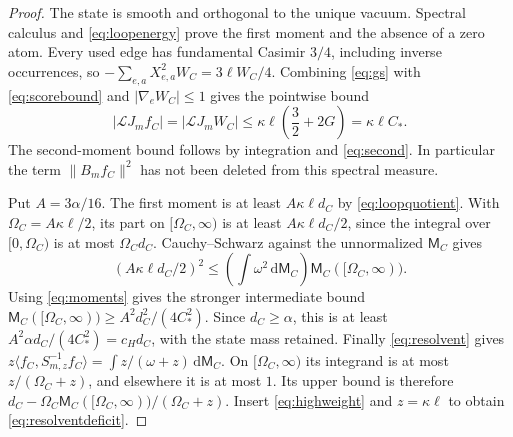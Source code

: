 \documentclass[11pt]{article}
\newcommand{\dd}{\,\mathrm d}
\newcommand{\LL}{\mathscr L}
\begin{document}
\begin{proof}
The state is smooth and orthogonal to the unique vacuum. Spectral
calculus and \eqref{eq:loopenergy} prove the first moment and the
absence of a zero atom. Every used edge has fundamental Casimir $3/4$,
including inverse occurrences, so
$-\sum_{e,a}X_{e,a}^2W_C=3\ell W_C/4$.
Combining \eqref{eq:gs} with \eqref{eq:scorebound} and
$|\nabla_e W_C|\leq1$ gives the pointwise bound
\[
 |\LL J_mf_C|=|\LL J_mW_C|
 \leq\kappa\ell\left(\frac32+2G\right)=\kappa\ell C_*.
\]
The second-moment bound follows by integration and
\eqref{eq:second}. In particular the term $\|B_mf_C\|^2$ has not been
deleted from this spectral measure.

Put $A=3\alpha/16$. The first moment is at least $A\kappa\ell d_C$
by \eqref{eq:loopquotient}. With $\Omega_C=A\kappa\ell/2$, its part on
$[\Omega_C,\infty)$ is at least $A\kappa\ell d_C/2$, since the integral
over $[0,\Omega_C)$ is at most $\Omega_C d_C$.
Cauchy--Schwarz against the unnormalized $\mathsf M_C$ gives
\[
 (A\kappa\ell d_C/2)^2
 \leq\left(\int\omega^2\dd\mathsf M_C\right)
                       \mathsf M_C([\Omega_C,\infty)).
\]
Using \eqref{eq:moments} gives the stronger intermediate bound
$\mathsf M_C([\Omega_C,\infty))\geq A^2d_C^2/(4C_*^2)$.
Since $d_C\geq\alpha$, this is at least
$A^2\alpha d_C/(4C_*^2)=c_Hd_C$, with the state mass retained.
Finally \eqref{eq:resolvent} gives
$z\langle f_C,S_{m,z}^{-1}f_C\rangle
=\int z/(\omega+z)\dd\mathsf M_C$.
On $[\Omega_C,\infty)$ its integrand is at most
$z/(\Omega_C+z)$, and elsewhere it is at most $1$.
Its upper bound is therefore
$d_C-\Omega_C\mathsf M_C([\Omega_C,\infty))/(\Omega_C+z)$.
Insert \eqref{eq:highweight} and $z=\kappa\ell$ to obtain
\eqref{eq:resolventdeficit}.
\end{proof}
\end{document}
